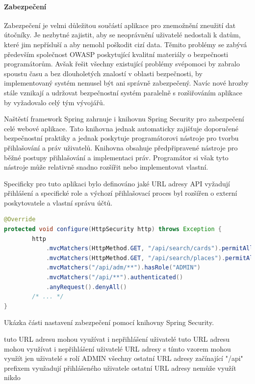 			\paragraph{Zabezpečení}

			Zabezpečení je velmi důležitou součástí aplikace pro znemožnění zneužití dat útočníky.
			Je nezbytné zajistit, aby se neoprávnění uživatelé nedostali k datům, které jim nepřísluší a aby nemohl
			poškodit cizí data.
			Těmito problémy se zabývá především společnost OWASP poskytující kvalitní materiály o bezpečnosti programátorům.
			Avšak řešit všechny existující problémy svépomoci by zabralo spoustu času a bez dlouholetých znalostí v
			oblasti bezpečnosti, by implementovaný systém nemusel být ani správně zabezpečený.
			Navíc nové hrozby stále vznikají a udržovat bezpečnostní systém paralelně s rozšiřováním aplikace by vyžadovalo
			celý tým vývojářů.

			Naštěstí framework Spring zahrnuje i knihovnu Spring Security pro zabezpečení celé webové aplikace.
			Tato knihovna jednak automaticky zajišťuje doporučené bezpečnostní praktiky a jednak poskytuje programátorovi
			nástroje pro tvorbu přihlašování a práv uživatelů.
			Knihovna obsahuje předpřipravené nástroje pro běžné postupy přihlašování a implementaci práv.
			Programátor si však tyto nástroje může relativně snadno rozšířit nebo implementovat vlastní.

			Specificky pro tuto aplikaci bylo definováno jaké \ac{URL} adresy \ac{API} vyžadují přihlášení a specifické
			role a výchozí přihlašovací proces byl rozšířen o externí poskytovatele a vlastní správu účtů.

			\begin{lstlisting}[language=Java]
@Override
protected void configure(HttpSecurity http) throws Exception {
        http
            .mvcMatchers(HttpMethod.GET, "/api/search/cards").permitAll()
            .mvcMatchers(HttpMethod.GET, "/api/search/places").permitAll()
            .mvcMatchers("/api/adm/**").hasRole("ADMIN")
            .mvcMatchers("/api/**").authenticated()
            .anyRequest().denyAll()
        /* ... */
}
			\end{lstlisting}
			Ukázka části nastavení zabezpečení pomocí knihovny Spring Security. %

			tuto URL adresu mohou využívat i nepřihlášení uživatelé
			tuto URL adresu mohou využívat i nepřihlášení uživatelé
			URL adresy s tímto vzorem mohou využít jen uživatelé s rolí ADMIN
			všechny ostatní URL adresy začínající "/api" prefixem využadují přihlášeného uživatele
			ostatní URL adresy nemůže využít nikdo

